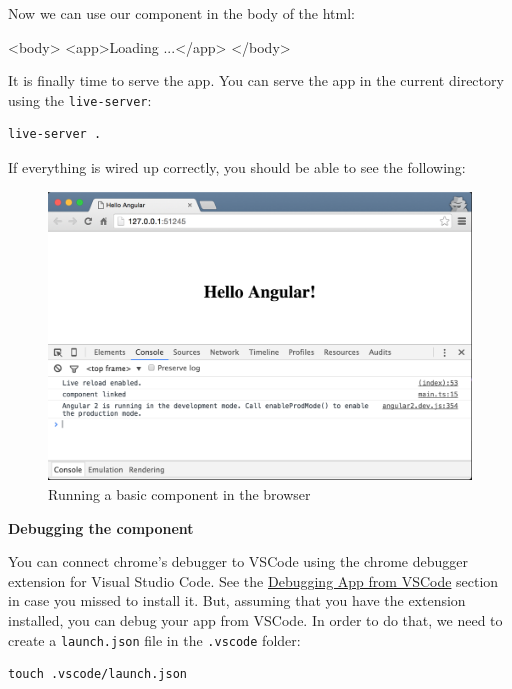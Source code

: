 \documentclass[12pt,]{article}
\newenvironment{Shaded}{}{}
\newcommand{\KeywordTok}[1]{\textcolor[rgb]{0.00,0.00,1.00}{{#1}}}
\newcommand{\NormalTok}[1]{{#1}}
\begin{document}
Now we can use our component in the body of the html:

\begin{Shaded}
\begin{Highlighting}[numbers=left,,]
\KeywordTok{<body>}
  \KeywordTok{<app>}\NormalTok{Loading ...}\KeywordTok{</app>}
\KeywordTok{</body>}
\end{Highlighting}
\end{Shaded}

It is finally time to serve the app. You can serve the app in the
current directory using the \texttt{live-server}:

\begin{verbatim}
live-server .
\end{verbatim}

If everything is wired up correctly, you should be able to see the
following:

\begin{figure}[htbp]
\centering
\includegraphics{images/hello-angular.png}
\caption{Running a basic component in the browser}
\end{figure}

\textbf{Debugging the component}

You can connect chrome's debugger to VSCode using the chrome debugger
extension for Visual Studio Code. See the
\protect\hyperlink{debugging-app-from-vscode}{Debugging App from VSCode}
section in case you missed to install it. But, assuming that you have
the extension installed, you can debug your app from VSCode. In order to
do that, we need to create a \texttt{launch.json} file in the
\texttt{.vscode} folder:

\begin{verbatim}
touch .vscode/launch.json
\end{verbatim}
\end{document}
